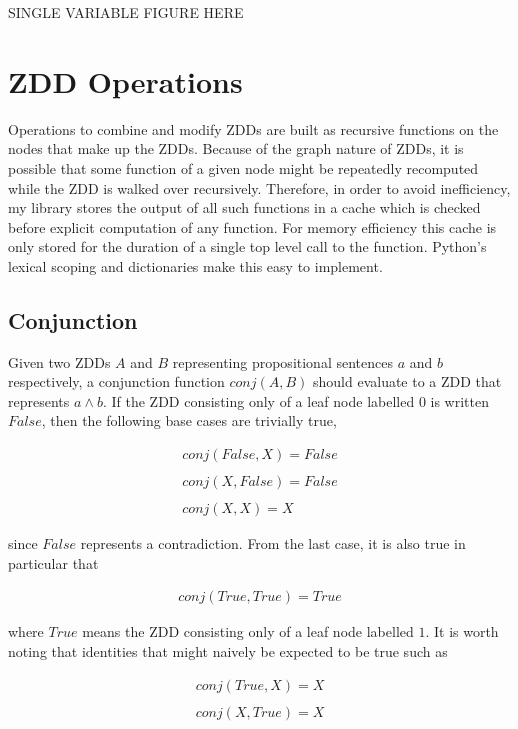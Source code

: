 \documentclass[12pt,a4paper,twoside,openright]{report}
\begin{document}
SINGLE VARIABLE FIGURE HERE

\section{ZDD Operations}
Operations to combine and modify ZDDs are built as recursive functions on the nodes that make up the ZDDs. Because of the graph nature of ZDDs, it is possible that some function of a given node might be repeatedly recomputed while the ZDD is walked over recursively. Therefore, in order to avoid inefficiency, my library stores the output of all such functions in a cache which is checked before explicit computation of any function. For memory efficiency this cache is only stored for the duration of a single top level call to the function. Python's lexical scoping and dictionaries make this easy to implement.

\subsection{Conjunction}
Given two ZDDs $A$ and $B$ representing propositional sentences $a$ and $b$ respectively, a conjunction function $\mathit{conj}(A,B)$ should evaluate to a ZDD that represents $a\wedge b$. If the ZDD consisting only of a leaf node labelled $0$ is written $\mathit{False}$, then the following base cases are trivially true,

\begin{gather*}
\mathit{conj}(\mathit{False}, X) = \mathit{False} \\ \\
\mathit{conj}(X, \mathit{False}) = \mathit{False} \\ \\
\mathit{conj}(X, X) = X
\end{gather*} 

since $\mathit{False}$ represents a contradiction. From the last case, it is also true in particular that

\begin{gather*}
\mathit{conj}(\mathit{True},\mathit{True}) = \mathit{True}
\end{gather*}

where $\mathit{True}$ means the ZDD consisting only of a leaf node labelled $1$. It is worth noting that identities that might naively be expected to be true such as

\begin{gather*}
\mathit{conj}(\mathit{True},X) = X \\ \\
\mathit{conj}(X, \mathit{True}) = X
\end{gather*}
\end{document}
